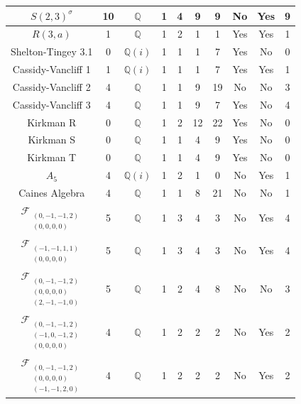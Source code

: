 \documentclass{amsart}
\begin{document}
\begin{table}[H]
\begin{tabular}{|c|c|c|c|c|c|c|c|c|c|}
      $S(2,3)^{\sigma}$ & 10 & $\mathbb{Q}$ & 1 & 4 & 9 & 9 & No & Yes & 9\\ \hline
      $R(3,a)$ & 1 & $\mathbb{Q}$ & 1 & 2 & 1 & 1 & Yes & Yes &1 \\ \hline
      Shelton-Tingey 3.1& 0 & $\mathbb{Q}(i)$ & 1 & 1  & 1 & 7 & Yes & No & 0\\ \hline
      Cassidy-Vancliff 1 & 1 & $\mathbb{Q}(i)$ & 1 & 1  & 1 & 7 &Yes & Yes & 1\\ \hline
      Cassidy-Vancliff 2 & 4 & $\mathbb{Q}$ & 1 & 1  & 9 & 19 &No & No & 3\\ \hline
      Cassidy-Vancliff 3& 4 & $\mathbb{Q}$ & 1 & 1  & 9 & 7 & Yes& No & 4\\ \hline
      Kirkman R& 0 &$\mathbb{Q}$ & 1& 2& 12& 22& Yes & No & 0\\ \hline
      Kirkman S& 0 & $\mathbb{Q}$& 1& 1& 4& 9& Yes & No & 0\\ \hline
      Kirkman T& 0 &$\mathbb{Q}$& 1& 1& 4&9 & Yes & No & 0\\ \hline
      $A_5$& 4 & $\mathbb{Q}(i)$ & 1& 2& 1& 0& No& Yes & 1\\ \hline
      Caines Algebra & 4 & $\mathbb{Q}$ & 1& 1& 8& 21& No& No & 1\\ \hline
      $\mathcal{F}_{\substack{(0,-1,-1,2)\\(0,0,0,0)}}$ &5 &$\mathbb{Q}$ & 1&3&4&3&No&Yes & 4\\ \hline
$\mathcal{F}_{\substack{(-1,-1,1,1)\\(0,0,0,0)}}$ &5& $\mathbb{Q}$ & 1&3&4&3&No&Yes & 4\\ \hline
 $\mathcal{F}_{\substack{(0,-1,-1,2)\\(0,0,0,0)\\(2,-1,-1,0)}}$&5& $\mathbb{Q}$ & 1&2&4&8&No&No &3 \\ \hline
 $\mathcal{F}_{\substack{(0,-1,-1,2)\\(-1,0,-1,2)\\(0,0,0,0)}}$ 
&4& $\mathbb{Q}$ & 1&2&2&2&No&Yes & 2\\ \hline
$\mathcal{F}_{\substack{(0,-1,-1,2)\\(0,0,0,0)\\(-1,-1,2,0)}}$ 
&4& $\mathbb{Q}$ & 1&2&2&2&No&Yes & 2\\ \hline
      

\end{tabular}
\end{table}
\end{document}
